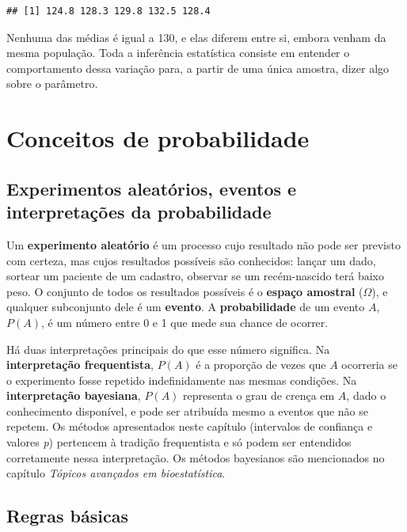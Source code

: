 \documentclass[
]{book}
\begin{document}
\begin{verbatim}
## [1] 124.8 128.3 129.8 132.5 128.4
\end{verbatim}

Nenhuma das médias é igual a 130, e elas diferem entre si, embora venham da mesma população. Toda a inferência estatística consiste em entender o comportamento dessa variação para, a partir de uma única amostra, dizer algo sobre o parâmetro.

\section{Conceitos de probabilidade}\label{conceitos-de-probabilidade}

\subsection{Experimentos aleatórios, eventos e interpretações da probabilidade}\label{experimentos-aleatuxf3rios-eventos-e-interpretauxe7uxf5es-da-probabilidade}

Um \textbf{experimento aleatório} é um processo cujo resultado não pode ser previsto com certeza, mas cujos resultados possíveis são conhecidos: lançar um dado, sortear um paciente de um cadastro, observar se um recém-nascido terá baixo peso. O conjunto de todos os resultados possíveis é o \textbf{espaço amostral} (\(\Omega\)), e qualquer subconjunto dele é um \textbf{evento}. A \textbf{probabilidade} de um evento \(A\), \(P(A)\), é um número entre 0 e 1 que mede sua chance de ocorrer.

Há duas interpretações principais do que esse número significa. Na \textbf{interpretação frequentista}, \(P(A)\) é a proporção de vezes que \(A\) ocorreria se o experimento fosse repetido indefinidamente nas mesmas condições. Na \textbf{interpretação bayesiana}, \(P(A)\) representa o grau de crença em \(A\), dado o conhecimento disponível, e pode ser atribuída mesmo a eventos que não se repetem. Os métodos apresentados neste capítulo (intervalos de confiança e valores \emph{p}) pertencem à tradição frequentista e só podem ser entendidos corretamente nessa interpretação. Os métodos bayesianos são mencionados no capítulo \emph{Tópicos avançados em bioestatística}.

\subsection{Regras básicas}\label{regras-buxe1sicas}
\end{document}
